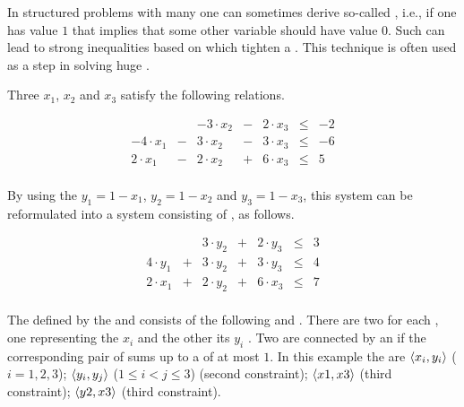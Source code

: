 \begin{application}
In structured problems with many  one can sometimes derive so-called , i.e., if one  has value $1$ that implies that some other variable should have value $0$. Such  can lead to strong inequalities based on  which tighten a . This technique is often used as a  step in solving huge .
\end{application}
\begin{example}
Three  $x_1$, $x_2$ and $x_3$ satisfy the following relations.

\begin{equation}
\begin{array}{rcrcrcr}
&&-3\cdot x_2&-&2\cdot x_3&\leq&-2\\
-4\cdot x_1&-&3\cdot x_2&-&3\cdot x_3&\leq&-6\\
2\cdot x_1&-&2\cdot x_2&+&6\cdot x_3&\leq&5
\end{array}
\end{equation}

\paragraph{}
By using the  $y_1=1-x_1$, $y_2=1-x_2$ and $y_3=1-x_3$, this system can be reformulated into a system consisting of , as follows.

\begin{equation}
\begin{array}{rcrcrcr}
&&3\cdot y_2&+&2\cdot y_3&\leq&3\\
4\cdot y_1&+&3\cdot y_2&+&3\cdot y_3&\leq&4\\
2\cdot x_1&+&2\cdot y_2&+&6\cdot x_3&\leq&7
\end{array}
\end{equation}

\paragraph{}
The  defined by the  and  consists of the following  and . There are two  for each , one representing the  $x_i$ and the other its  $y_i$ . Two  are connected by an  if the corresponding pair of  sums up to a  of at most $1$. In this example the  are $\left\langle x_i,y_i \right\rangle$ ($i=1,2,3$); $\left\langle y_i,y_j \right\rangle$ ($1\leq i < j \leq 3$) (second constraint); $\left\langle x1,x3 \right\rangle$ (third constraint); $\left\langle y2,x3 \right\rangle$ (third constraint).


\end{example}
